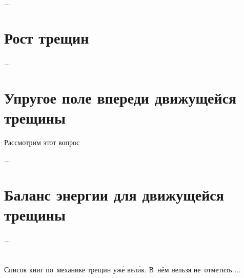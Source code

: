 \begin{otherlanguage}{russian}
...



\section{Рост трещин}

...



\section{Упругое поле впереди движущейся трещины}

Рассмотрим этот вопрос

...



\section{Баланс энергии для движущейся трещины}

...



\vspace{8mm}
\hfill\begin{minipage}[b]{0.95\linewidth}
\fontsize{10}{12}\selectfont

\section*{\wordforbibliography}

Список книг по~механике трещин уж\'{е} вел\'{и}к. В~нём нельзя не~отметить ...

\end{minipage}

\end{otherlanguage}

